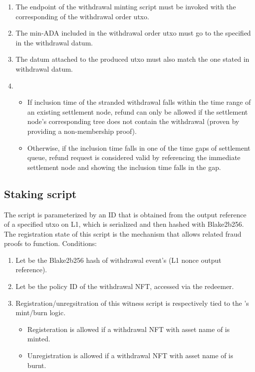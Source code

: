 \documentclass[../midgard.tex]{subfiles}
\begin{document}
\begin{description}
\begin{enumerate}
      \item The  endpoint of the withdrawal minting script must be invoked with the corresponding  of the withdrawal order utxo.
      \item The min-ADA included in the withdrawal order utxo must go to the  specified in the withdrawal datum.
      \item The datum attached to the produced utxo must also match the one stated in withdrawal datum.
      \item 
        \begin{itemize}
          \item If inclusion time of the stranded withdrawal falls within the time range of an existing settlement node, refund can only be allowed if the settlement node's corresponding tree does not contain the withdrawal (proven by providing a non-membership proof).
          \item Otherwise, if the inclusion time falls in one of the time gaps of settlement queue, refund request is considered valid by referencing the immediate settlement node and showing the inclusion time falls in the gap.
        \end{itemize}
    \end{enumerate}
\end{description}

\subsection{Staking script}
\label{h:withdrawal-order-staking-script}
The  script is parameterized by an ID that is obtained from the output reference of a specified utxo on L1, which is serialized and then hashed with Blake2b256.
The registration state of this script is the mechanism that allows related fraud proofs to function.
Conditions:

\begin{enumerate}
  \item Let  be the Blake2b256 hash of withdrawal event's  (L1 nonce output reference).
  \item Let  be the policy ID of the withdrawal NFT, accessed via the redeemer.
  \item Registration/unregsitration of this witness script is respectively tied to the 's mint/burn logic. 
    \begin{itemize}
      \item Registeration is allowed if a withdrawal NFT with asset name of  is minted.
      \item Unregistration is allowed if a withdrawal NFT with asset name of  is burnt.
    \end{itemize}
\end{enumerate}
\end{document}
